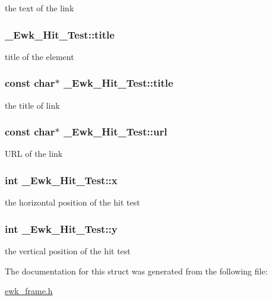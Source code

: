 the text of the link \hypertarget{struct__Ewk__Hit__Test_af942e4317ab325854ee913481505af5f}{
\subsubsection[{title}]{ \+\_\+\+Ewk\+\_\+\+Hit\+\_\+\+Test\+::title}}\label{struct__Ewk__Hit__Test_af942e4317ab325854ee913481505af5f}
title of the element \hypertarget{struct__Ewk__Hit__Test_a23dc7444d3737bc2ef59ffc13fe2a54d}{
\subsubsection[{title}]{\setlength{\rightskip}{0pt plus 5cm}const char$\ast$ \+\_\+\+Ewk\+\_\+\+Hit\+\_\+\+Test\+::title}}\label{struct__Ewk__Hit__Test_a23dc7444d3737bc2ef59ffc13fe2a54d}
the title of link \hypertarget{struct__Ewk__Hit__Test_a7b7a61867cc7a128372f34a83ad01757}{
\subsubsection[{url}]{\setlength{\rightskip}{0pt plus 5cm}const char$\ast$ \+\_\+\+Ewk\+\_\+\+Hit\+\_\+\+Test\+::url}}\label{struct__Ewk__Hit__Test_a7b7a61867cc7a128372f34a83ad01757}
U\+R\+L of the link \hypertarget{struct__Ewk__Hit__Test_ada345a274fbed9b53aa51044faed47ba}{
\subsubsection[{x}]{\setlength{\rightskip}{0pt plus 5cm}int \+\_\+\+Ewk\+\_\+\+Hit\+\_\+\+Test\+::x}}\label{struct__Ewk__Hit__Test_ada345a274fbed9b53aa51044faed47ba}
the horizontal position of the hit test \hypertarget{struct__Ewk__Hit__Test_a3ab9e7d066435c8949f3e52c96eb9691}{
\subsubsection[{y}]{\setlength{\rightskip}{0pt plus 5cm}int \+\_\+\+Ewk\+\_\+\+Hit\+\_\+\+Test\+::y}}\label{struct__Ewk__Hit__Test_a3ab9e7d066435c8949f3e52c96eb9691}
the vertical position of the hit test 

The documentation for this struct was generated from the following file\+:\begin{DoxyCompactItemize}
\item 
\hyperlink{ewk__frame_8h}{ewk\+\_\+frame.\+h}\end{DoxyCompactItemize}
